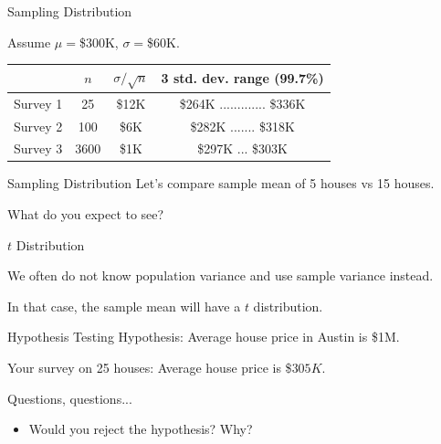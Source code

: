 \documentclass{beamer}\usepackage[]{graphicx}\usepackage[]{color}
\begin{document}
\begin{darkframes}
    \begin{frame}[label=lists]{Sampling Distribution}
    
    Assume $\mu=$\$300K, $\sigma=$\$60K. \newline
    
   	\begin{table}[!b]
        {\carlitoTLF %
        \begin{tabularx}{\textwidth}{Xccc}
          \textbf{} &  $n$ & $\sigma/\sqrt{n}$  & 3 std. dev. range (99.7\%) \\
          \toprule
          Survey 1     & 25   &  \$12K	&\$264K ............. \$336K   \\
          Survey 2     & 100  &  \$6K	&\$282K ....... \$318K   \\
		  Survey 3     & 3600 &  \$1K	&\$297K ... \$303K   \\
          \bottomrule
        \end{tabularx}}	
	\end{table}   
    
    \end{frame}
    
    
	\begin{frame}[label=lists]{Sampling Distribution}
		Let's compare sample mean of 5 houses vs 15 houses. \newline
		
		What do you expect to see?
	\end{frame}
	

    
    
    \begin{frame}[label=lists]{$t$ Distribution}
    
    	We often do not know population variance and use sample variance instead. \newline
    	
    	
		In that case, the sample mean will have a \alert{$t$ distribution}.
	\end{frame}	
    
    
    
    \begin{frame}[label=lists]{Hypothesis Testing}
    Hypothesis: Average house price in Austin is \$1M. \pause
    
    Your survey on 25 houses: Average house price is \$$305K$. \newline \pause
    
    Questions, questions... \pause
    \begin{itemize}
   \item Would you reject the hypothesis? Why? \pause
    

\end{itemize}
\end{frame}
\end{darkframes}
\end{document}
